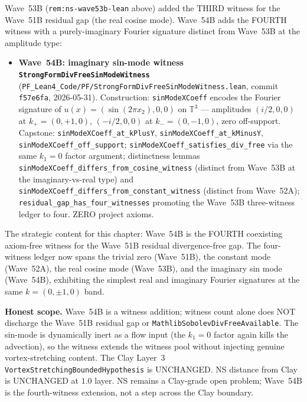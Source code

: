 \begin{remark}[Wave~54B update: \texttt{StrongFormDivFreeSinModeWitness} --- FOURTH Wave~51B residual-gap witness, imaginary sin-mode $\pm(i/2)e_1$ at $k = (0, \pm 1, 0)$ on $\mathbb{T}^3$, 2026-05-31]\label{rem:ns-wave54b-lean}
Wave~53B (\texttt{rem:ns-wave53b-lean} above) added the THIRD witness for the Wave~51B residual gap (the real cosine mode). Wave~54B adds the FOURTH witness with a purely-imaginary Fourier signature distinct from Wave~53B at the amplitude type:
\begin{itemize}
  \item \textbf{Wave~54B: imaginary sin-mode witness \texttt{StrongFormDivFreeSinModeWitness}} (\texttt{PF\_Lean4\_Code/PF/StrongFormDivFreeSinModeWitness.lean}, commit \texttt{f57e6fa}, 2026-05-31). Construction: \texttt{sinModeXCoeff} encodes the Fourier signature of $u(x) = (\sin(2\pi x_2), 0, 0)$ on $\mathbb{T}^3$ --- amplitudes $(i/2, 0, 0)$ at $k_+ = (0, +1, 0)$, $(-i/2, 0, 0)$ at $k_- = (0, -1, 0)$, zero off-support. Capstone: \texttt{sinModeXCoeff\_at\_kPlusY}, \texttt{sinModeXCoeff\_at\_kMinusY}, \texttt{sinModeXCoeff\_off\_support}; \texttt{sinModeXCoeff\_satisfies\_div\_free} via the same $k_1 = 0$ factor argument; distinctness lemmas \texttt{sinModeXCoeff\_differs\_from\_cosine\_witness} (distinct from Wave~53B at the imaginary-vs-real type) and \texttt{sinModeXCoeff\_differs\_from\_constant\_witness} (distinct from Wave~52A); \texttt{residual\_gap\_has\_four\_witnesses} promoting the Wave~53B three-witness ledger to four. ZERO project axioms.
\end{itemize}
The strategic content for this chapter: Wave~54B is the FOURTH coexisting axiom-free witness for the Wave~51B residual divergence-free gap. The four-witness ledger now spans the trivial zero (Wave~51B), the constant mode (Wave~52A), the real cosine mode (Wave~53B), and the imaginary sin mode (Wave~54B), exhibiting the simplest real and imaginary Fourier signatures at the same $k = (0, \pm 1, 0)$ band.

\textbf{Honest scope.} Wave~54B is a witness addition; witness count alone does NOT discharge the Wave~51B residual gap or \texttt{MathlibSobolevDivFreeAvailable}. The sin-mode is dynamically inert as a flow input (the $k_1 = 0$ factor again kills the advection), so the witness extends the witness pool without injecting genuine vortex-stretching content. The Clay Layer~3 \texttt{VortexStretchingBoundedHypothesis} is UNCHANGED. NS distance from Clay is UNCHANGED at $1.0$ layer. NS remains a Clay-grade open problem; Wave~54B is the fourth-witness extension, not a step across the Clay boundary.
\end{remark}

